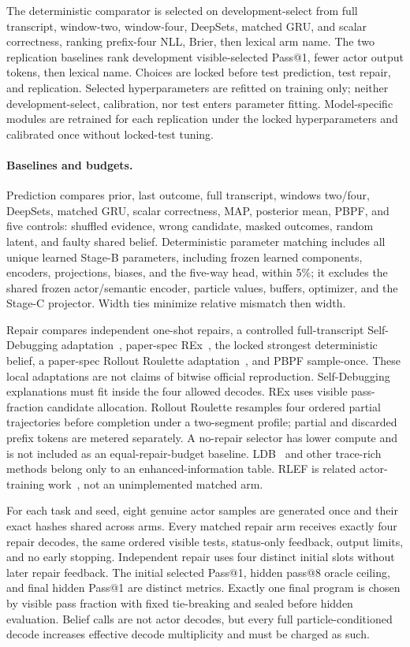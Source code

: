 The deterministic comparator is selected on development-select from full
transcript, window-two, window-four, DeepSets, matched GRU, and scalar
correctness, ranking prefix-four NLL, Brier, then lexical arm name. The two
replication baselines rank development visible-selected Pass@1, fewer actor
output tokens, then lexical name. Choices are locked before test prediction,
test repair, and replication. Selected hyperparameters are refitted on training
only; neither development-select, calibration, nor test enters parameter
fitting. Model-specific modules are retrained for each replication under the
locked hyperparameters and calibrated once without locked-test tuning.

\paragraph{Baselines and budgets.}
Prediction compares prior, last outcome, full transcript, windows two/four,
DeepSets, matched GRU, scalar correctness, MAP, posterior mean, PBPF, and five
controls: shuffled evidence, wrong candidate, masked outcomes, random latent,
and faulty shared belief. Deterministic parameter matching includes all unique
learned Stage-B parameters, including frozen learned components, encoders,
projections, biases, and the five-way head, within 5\%; it excludes the shared
frozen actor/semantic encoder, particle values, buffers, optimizer, and the
Stage-C projector. Width ties minimize relative mismatch then width.

Repair compares independent one-shot repairs, a controlled full-transcript
Self-Debugging adaptation~\citep{selfdebug}, paper-spec REx~\citep{rex}, the
locked strongest deterministic belief, a paper-spec Rollout Roulette
adaptation~\citep{roulette}, and PBPF sample-once. These local adaptations are
not claims of bitwise official reproduction. Self-Debugging explanations must
fit inside the four allowed decodes. REx uses visible pass-fraction candidate
allocation. Rollout Roulette resamples four ordered partial trajectories
before completion under a two-segment profile; partial and discarded prefix
tokens are metered separately. A no-repair selector has lower compute and is
not included as an equal-repair-budget baseline. LDB~\citep{ldb} and other
trace-rich methods belong only to an enhanced-information table. RLEF is
related actor-training work~\citep{rlef}, not an unimplemented matched arm.

For each task and seed, eight genuine actor samples are generated once and
their exact hashes shared across arms. Every matched repair arm receives
exactly four repair decodes, the same ordered visible tests, status-only
feedback, output limits, and no early stopping. Independent repair uses four
distinct initial slots without later repair feedback. The initial selected
Pass@1, hidden pass@8 oracle ceiling, and final hidden Pass@1 are distinct
metrics. Exactly one final program is chosen by visible pass fraction with
fixed tie-breaking and sealed before hidden evaluation. Belief calls are not
actor decodes, but every full particle-conditioned decode increases effective
decode multiplicity and must be charged as such.

